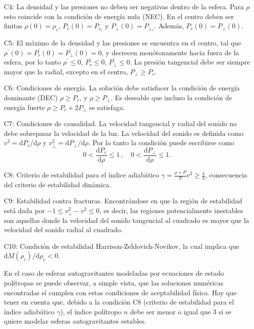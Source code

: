 \documentclass[letterpaper,11pt]{article}
\begin{document}
C4: La densidad y las presiones no deben ser negativas dentro de la esfera. Para $\rho$ esto coincide con la condición de energía nula (NEC). En el centro deben ser finitas $\rho(0) = \rho_{c}$, $P_{r}(0) = P_{r_{c}}$ y $P_{\perp}(0) = P_{\perp_{c}}$. Además, $P_{r}(0) = P_{\perp}(0)$.

C5: El máximo de la densidad y las presiones se encuentra en el centro, tal que $\rho^{\prime}(0) = P_{r}^{\prime}(0) = P_{\perp}^{\prime}(0) = 0$, y decrecen monótonamente hacia fuera de la esfera, por lo tanto $\rho^{\prime} \leq 0$, $P_{r}^{\prime} \leq 0$, $P_{\perp}^{\prime} \leq 0$. La presión tangencial debe ser siempre mayor que la radial, excepto en el centro, $P_{\perp} \geq P_{r} $.

C6: Condiciones de energía. La solución debe satisfacer la condición de energía dominante (DEC) $\rho \geq P_{r}$, y $\rho \geq P_{\perp}$. Es deseable que incluso la condición de energía fuerte $\rho \geq P_{r} + 2 P_{\perp}$ se satisfaga.

C7: Condiciones de causalidad. La velocidad tangencial y radial del sonido no debe sobrepasar la velocidad de la luz. La velocidad del sonido es definida como $v^{2} = \mathrm{d}P_{r}/\mathrm{d}\rho$ y $v^{2}_{\perp} = \mathrm{d}P_{\perp}/\mathrm{d}\rho$. Por lo tanto la condición puede escribirse como
\begin{equation*}
    0 < \frac{\mathrm{d}P_{r}}{\mathrm{d}\rho} \leq 1 \, , \quad 0 < \frac{\mathrm{d}P_{\perp}}{\mathrm{d}\rho} \leq 1.
\end{equation*}

C8: Criterio de estabilidad para el índice adiabático  $\gamma = \frac{\rho + P}{P} v^{2} \geq \frac{4}{3}$, consecuencia del criterio de estabilidad dinámica.

C9: Estabilidad contra fracturas. Encontrándose en \cite{AbreuHernandezNunez2007b} que la región de estabilidad está dada por $-1 \leq v^{2}_{\perp} - v^{2} \leq 0$, es decir, las regiones potencialmente inestables son aquellas donde la velocidad del sonido tangencial al cuadrado es mayor que la velocidad del sonido radial al cuadrado. 

C10: Condición de estabilidad Harrison-Zeldovich-Novikov, la cual implica que  $\mathrm{d}M(\rho_{c}) / \mathrm{d}\rho_{c} < 0 $.




En el caso de esferas autogravitantes modeladas por ecuaciones de estado polítropas \cite{tooper1964stability} se puede observar, a simple vista, que las soluciones numéricas encontradas sí cumplen con estas condiciones de aceptabilidad física. Hay que tener en cuenta que, debido a la condición C8 (criterio de estabilidad para el índice adiabático $\gamma$), el índice polítropo $n$ debe ser menor o igual que 3 si se quiere modelar esferas autogravitantes estables.
\end{document}

